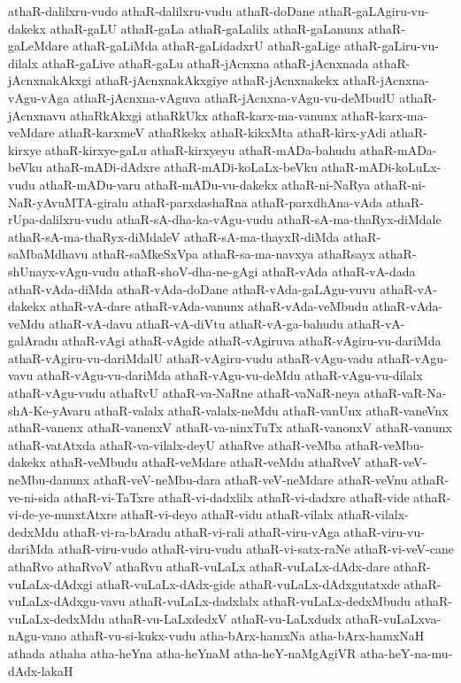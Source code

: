 {athaR-dalilxru-vudo
athaR-dalilxru-vudu
athaR-doDane
athaR-gaLAgiru-vu-dakekx
athaR-gaLU
athaR-gaLa
athaR-gaLalilx
athaR-gaLanunx
athaR-gaLeMdare
athaR-gaLiMda
athaR-gaLidadxrU
athaR-gaLige
athaR-gaLiru-vu-dilalx
athaR-gaLive
athaR-gaLu
athaR-jAcnxna
athaR-jAcnxnada
athaR-jAcnxnakAkxgi
athaR-jAcnxnakAkxgiye
athaR-jAcnxnakekx
athaR-jAcnxna-vAgu-vAga
athaR-jAcnxna-vAguva
athaR-jAcnxna-vAgu-vu-deMbudU
athaR-jAcnxnavu
athaRkAkxgi
athaRkUkx
athaR-karx-ma-vanunx
athaR-karx-ma-veMdare
athaR-karxmeV
athaRkekx
athaR-kikxMta
athaR-kirx-yAdi
athaR-kirxye
athaR-kirxye-gaLu
athaR-kirxyeyu
athaR-mADa-bahudu
athaR-mADa-beVku
athaR-mADi-dAdxre
athaR-mADi-koLaLx-beVku
athaR-mADi-koLuLx-vudu
athaR-mADu-varu
athaR-mADu-vu-dakekx
athaR-ni-NaRya
athaR-ni-NaR-yAvuMTA-giralu
athaR-parxdashaRna
athaR-parxdhAna-vAda
athaR-rUpa-dalilxru-vudu
athaR-sA-dha-ka-vAgu-vudu
athaR-sA-ma-thaRyx-diMdale
athaR-sA-ma-thaRyx-diMdaleV
athaR-sA-ma-thayxR-diMda
athaR-saMbaMdhavu
athaR-saMkeSxVpa
athaR-sa-ma-navxya
athaRsayx
athaR-shUnayx-vAgu-vudu
athaR-shoV-dha-ne-gAgi
athaR-vAda
athaR-vA-dada
athaR-vAda-diMda
athaR-vAda-doDane
athaR-vAda-gaLAgu-vuvu
athaR-vA-dakekx
athaR-vA-dare
athaR-vAda-vanunx
athaR-vAda-veMbudu
athaR-vAda-veMdu
athaR-vA-davu
athaR-vA-diVtu
athaR-vA-ga-bahudu
athaR-vA-galAradu
athaR-vAgi
athaR-vAgide
athaR-vAgiruva
athaR-vAgiru-vu-dariMda
athaR-vAgiru-vu-dariMdalU
athaR-vAgiru-vudu
athaR-vAgu-vadu
athaR-vAgu-vavu
athaR-vAgu-vu-dariMda
athaR-vAgu-vu-deMdu
athaR-vAgu-vu-dilalx
athaR-vAgu-vudu
athaRvU
athaR-va-NaRne
athaR-vaNaR-neya
athaR-vaR-Na-shA-Ke-yAvaru
athaR-valalx
athaR-valalx-neMdu
athaR-vanUnx
athaR-vaneVnx
athaR-vanenx
athaR-vanenxV
athaR-va-ninxTuTx
athaR-vanonxV
athaR-vanunx
athaR-vatAtxda
athaR-va-vilalx-deyU
athaRve
athaR-veMba
athaR-veMbu-dakekx
athaR-veMbudu
athaR-veMdare
athaR-veMdu
athaRveV
athaR-veV-neMbu-danunx
athaR-veV-neMbu-dara
athaR-veV-neMdare
athaR-veVnu
athaR-ve-ni-sida
athaR-vi-TaTxre
athaR-vi-dadxlilx
athaR-vi-dadxre
athaR-vide
athaR-vi-de-ye-nunxtAtxre
athaR-vi-deyo
athaR-vidu
athaR-vilalx
athaR-vilalx-dedxMdu
athaR-vi-ra-bAradu
athaR-vi-rali
athaR-viru-vAga
athaR-viru-vu-dariMda
athaR-viru-vudo
athaR-viru-vudu
athaR-vi-satx-raNe
athaR-vi-veV-cane
athaRvo
athaRvoV
athaRvu
athaR-vuLaLx
athaR-vuLaLx-dAdx-dare
athaR-vuLaLx-dAdxgi
athaR-vuLaLx-dAdx-gide
athaR-vuLaLx-dAdxgutatxde
athaR-vuLaLx-dAdxgu-vavu
athaR-vuLaLx-dadxlalx
athaR-vuLaLx-dedxMbudu
athaR-vuLaLx-dedxMdu
athaR-vu-LaLxdedxV
athaR-vu-LaLxdudx
athaR-vuLaLxva-nAgu-vano
athaR-vu-si-kukx-vudu
atha-bArx-hamxNa
atha-bArx-hamxNaH
athada
athaha
atha-heYna
atha-heYnaM
atha-heY-naMgAgiVR
atha-heY-na-mu-dAdx-lakaH
}
